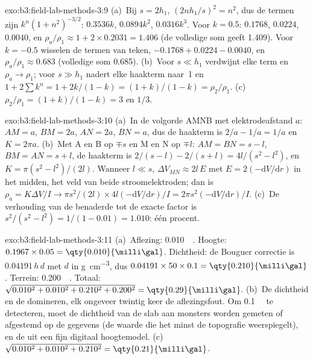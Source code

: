 \begin{solution}{exo:b3:field-lab-methods-3:9}
(a)~Bij $s = 2h_1$, $(2nh_1/s)^2 = n^2$, dus de termen zijn $k^n(1 +
n^2)^{-3/2}$: $0.3536k$, $0.0894k^2$, $0.0316k^3$. Voor $k = 0.5$:
$\num{0.1768}$, $\num{0.0224}$, $\num{0.0040}$, en $\rho_a/\rho_1 \approx
1 + 2\times0.2031 = \num{1.406}$ (de volledige som geeft \num{1.409}). Voor $k
= -0.5$ wisselen de termen van teken, $-0.1768 + 0.0224 - 0.0040$, en
$\rho_a/\rho_1 \approx \num{0.683}$ (volledige som \num{0.685}). (b)~Voor $s \ll
h_1$ verdwijnt elke term en $\rho_a \to \rho_1$; voor $s \gg h_1$ nadert elke
haakterm naar~1 en $1 + 2\sum k^n = 1 + 2k/(1 - k) = (1 + k)/(1 -
k) = \rho_2/\rho_1$. (c)~$\rho_2/\rho_1 = (1 + k)/(1 - k) = 3$ en $1/3$.
\end{solution}

\begin{solution}{exo:b3:field-lab-methods-3:10}
(a)~In de volgorde AMNB met elektrodeafstand $a$: $AM = a$, $BM = 2a$, $AN = 2a$,
$BN = a$, dus de haakterm is $2/a - 1/a = 1/a$ en $K = 2\pi a$.
(b)~Met A en B op $\mp s$ en M en N op $\mp l$: $AM = BN = s - l$,
$BM = AN = s + l$, de haakterm is $2/(s - l) - 2/(s + l) = 4l/(s^2 -
l^2)$, en $K = \pi(s^2 - l^2)/(2l)$. Wanneer $l \ll s$, $\Delta V_{MN}
\approx 2l\,E$ met $E = 2(-\mathrm{d}V/\mathrm{d}r)$ in het midden, het
veld van beide stroomelektroden; dan is $\rho_a = K\Delta V/I \to
\pi s^2/(2l)\times 4l(-\mathrm{d}V/\mathrm{d}r)/I = 2\pi s^2(-
\mathrm{d}V/\mathrm{d}r)/I$. (c)~De verhouding van de benaderde tot de
exacte factor is $s^2/(s^2 - l^2) = 1/(1 - 0.01) = 1.010$: één procent.
\end{solution}

\begin{solution}{exo:b3:field-lab-methods-3:11}
(a)~Aflezing: \qty{0.010}{\milli\gal}. Hoogte:
$0.1967\times0.05 = \qty{0.010}{\milli\gal}$. Dichtheid: de Bouguer
correctie is $0.04191\,h\,d$ met $d$ in \unit{g.cm^{-3}}, dus
$0.04191\times50\times0.1 = \qty{0.210}{\milli\gal}$. Terrein:
\qty{0.200}{\milli\gal}. Totaal: $\sqrt{0.010^2 + 0.010^2 + 0.210^2 +
0.200^2} = \qty{0.29}{\milli\gal}$. (b)~De dichtheid en de 
domineren, elk ongeveer twintig keer de aflezingsfout. Om
\qty{0.1}{\milli\gal} te detecteren, moet de dichtheid van de slab aan
monsters worden gemeten of afgestemd op de gegevens (de waarde die het minst
de topografie weerspiegelt), en de  uit een fijn digitaal hoogtemodel.
(c)~$\sqrt{0.010^2 + 0.010^2 + 0.210^2} = \qty{0.21}{\milli\gal}$.
\end{solution}

